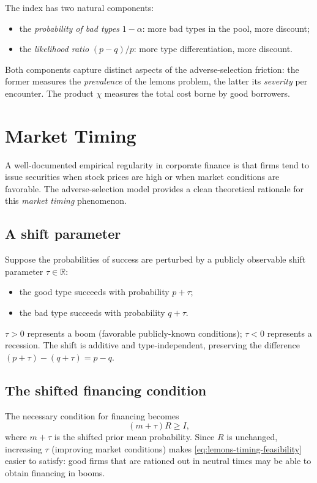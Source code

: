 \documentclass[11pt,a4paper,oneside]{book}
\def\R{\mathbb{R}}
\def\geq{\geqslant}
\theoremstyle{plain}
\theoremstyle{definition}
\theoremstyle{remark}
\numberwithin{equation}{chapter}
\begin{document}
The index has two natural components:
\begin{itemize}
  \item the \emph{probability of bad types} $1 - \alpha$: more bad types in the pool, more discount;
  \item the \emph{likelihood ratio} $(p - q)/p$: more type differentiation, more discount.
\end{itemize}
Both components capture distinct aspects of the adverse-selection friction: the former measures the \emph{prevalence} of the lemons problem, the latter its \emph{severity} per encounter.
The product $\chi$ measures the total cost borne by good borrowers.

\section{Market Timing}
\label{sec:lemons-timing}

A well-documented empirical regularity in corporate finance is that firms tend to issue securities when stock prices are high or when market conditions are favorable.
The adverse-selection model provides a clean theoretical rationale for this \emph{market timing} phenomenon.

\subsection{A shift parameter}

Suppose the probabilities of success are perturbed by a publicly observable shift parameter $\tau \in \R$:
\begin{itemize}
  \item the good type succeeds with probability $p + \tau$;
  \item the bad type succeeds with probability $q + \tau$.
\end{itemize}
$\tau > 0$ represents a boom (favorable publicly-known conditions); $\tau < 0$ represents a recession.
The shift is additive and type-independent, preserving the difference $(p + \tau) - (q + \tau) = p - q$.

\subsection{The shifted financing condition}

The necessary condition for financing becomes
\begin{equation}\label{eq:lemons-timing-feasibility}
  (m + \tau) R \geq I,
\end{equation}
where $m + \tau$ is the shifted prior mean probability.
Since $R$ is unchanged, increasing $\tau$ (improving market conditions) makes \eqref{eq:lemons-timing-feasibility} easier to satisfy: good firms that are rationed out in neutral times may be able to obtain financing in booms.
\end{document}
